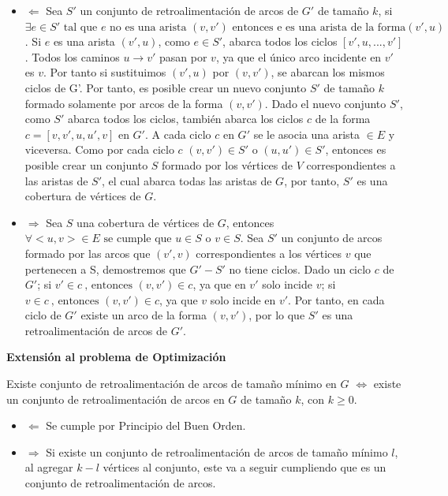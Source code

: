 \documentclass{article}
\begin{document}
\begin{itemize}
    \item \(\Leftarrow\) 
    Sea \(S'\) un conjunto de retroalimentación de arcos de \(G'\) de tamaño \(k\), si \(\exists e \in S' \text{ tal que } e \text{ no es una arista }  (v,v') \text{ entonces e es una arista de la forma}  (v',u) \). Si \( e\) es una arista \((v',u)\), como \(e \in S'\), abarca todos los ciclos \( [v',u,...,v']\). Todos los caminos \( u \rightarrow v'\) pasan por \(v\), ya que el único arco incidente en \(v'\) es \(v\). Por tanto si sustituimos \((v',u)\) por \((v,v')\), se abarcan los mismos ciclos de G'. Por tanto, es posible crear un nuevo conjunto \(S'\) de tamaño \(k\) formado solamente por arcos de la forma \((v,v')\). Dado el nuevo conjunto \(S'\), como \(S'\) abarca todos los ciclos, también abarca los ciclos \(c\) de la forma \(c = [v,v',u,u',v]\) en \(G'\). A cada ciclo \(c\) en \(G'\) se le asocia una arista \(<u,v> \in E\) y viceversa. Como por cada ciclo \(c\)  \((v,v') \in S' \text{ o } (u,u') \in S'\), entonces es posible crear un conjunto \(S\) formado por los vértices de \(V\) correspondientes a las aristas de \(S'\), el cual abarca todas las aristas de \(G\), por tanto, \(S'\) es una cobertura de vértices de \(G\).
    

    \item \(\Rightarrow\) 
    Sea \(S\) una cobertura de vértices de \(G\), entonces \(\forall <u,v> \in E \text{ se cumple que } u \in S \text{ o } v \in S\). Sea \(S'\) un conjunto de arcos formado por las arcos que \((v',v)\) correspondientes a los vértices \(v\) que pertenecen a S, demostremos que \(G'-S'\) no tiene ciclos. Dado un ciclo \(c\) de \(G'\); si \(v' \in c\ \text{, entonces } (v,v') \in c\), ya que en \(v'\) solo incide \(v\); si \(v \in c\ \text{, entonces } (v,v') \in c\), ya que \(v\) solo incide en \(v'\). Por tanto, en cada ciclo de \(G'\) existe un arco de la forma \((v,v')\), por lo que \(S'\) es una retroalimentación de arcos de \(G'\).
    
    

\end{itemize}

\textbf{Extensión al problema de Optimización}

Existe conjunto de retroalimentación de arcos de tamaño mínimo en \(G\) \(\iff\) existe un conjunto de retroalimentación de arcos en \(G\) de tamaño \(k\), con \(k \geq 0\).
\begin{itemize}
    \item \(\Leftarrow\) 
    Se cumple por Principio del Buen Orden.
    \item \(\Rightarrow\) 
    Si existe un conjunto de retroalimentación de arcos de tamaño mínimo \(l\), al agregar \(k-l\) vértices al conjunto, este va a seguir cumpliendo que es un conjunto de retroalimentación de arcos.
\end{itemize}
\end{document}
